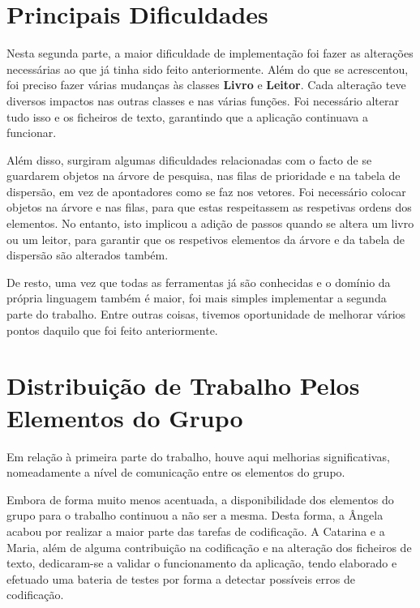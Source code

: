 \documentclass[12pt,a4paper,reqno]{report}
\numberwithin{figure}{section}
\numberwithin{equation}{section}
\begin{document}
\chapter{Principais Dificuldades}

Nesta segunda parte, a maior dificuldade de implementação foi fazer as alterações necessárias ao que já tinha sido feito anteriormente. Além do que se acrescentou, foi preciso fazer várias mudanças às classes \textbf{Livro} e \textbf{Leitor}. Cada alteração teve diversos impactos nas outras classes e nas várias funções. Foi necessário alterar tudo isso e os ficheiros de texto, garantindo que a aplicação continuava a funcionar.

Além disso, surgiram algumas dificuldades relacionadas com o facto de se guardarem objetos na árvore de pesquisa, nas filas de prioridade e na tabela de dispersão, em vez de apontadores como se faz nos vetores. Foi necessário colocar objetos na árvore e nas filas, para que estas respeitassem as respetivas ordens dos elementos. No entanto, isto implicou a adição de passos quando se altera um livro ou um leitor, para garantir que os respetivos elementos da árvore e da tabela de dispersão são alterados também.

De resto, uma vez que todas as ferramentas já são conhecidas e o domínio da própria linguagem também é maior, foi mais simples implementar a segunda parte do trabalho. Entre outras coisas, tivemos oportunidade de melhorar vários pontos daquilo que foi feito anteriormente.

\chapter{Distribuição de Trabalho Pelos Elementos do Grupo}

Em relação à primeira parte do trabalho, houve aqui melhorias significativas, nomeadamente a nível de comunicação entre os elementos do grupo.

Embora de forma muito menos acentuada, a disponibilidade dos elementos do grupo para o trabalho continuou a não ser a mesma. Desta forma, a Ângela acabou por realizar a maior parte das tarefas de codificação. A Catarina e a Maria, além de alguma contribuição na codificação e na alteração dos ficheiros de texto, dedicaram-se a validar o funcionamento da aplicação, tendo elaborado e efetuado uma bateria de testes por forma a detectar possíveis erros de codificação.
\end{document}
